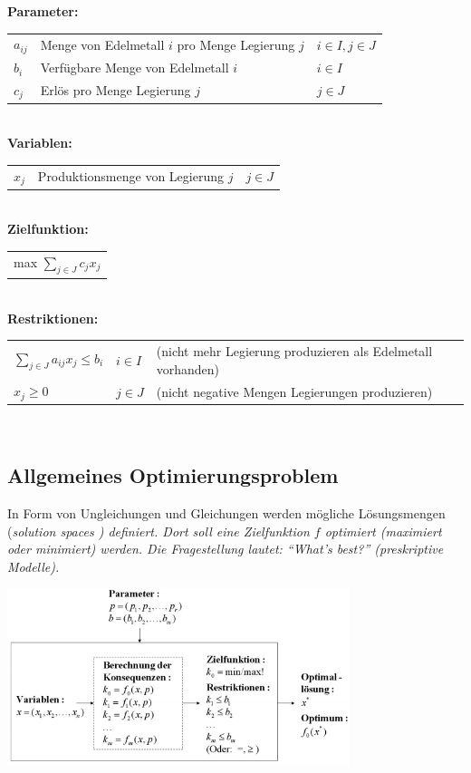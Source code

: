     \textbf{Parameter:}\\
    \begin{tabular}{lll}
      $a_{ij}$ & Menge von Edelmetall $i$ pro Menge Legierung $j$ & $i \in I, j \in J$\\
      $b_i$    & Verfügbare Menge von Edelmetall $i$              & $i \in I$\\
      $c_j$    & Erlös pro Menge Legierung $j$                    & $j \in J$\\
    \end{tabular}\\

    \textbf{Variablen:}\\
    \begin{tabular}{lll}
      $x_j$ & Produktionsmenge von Legierung $j$ & $j \in J$\\
    \end{tabular}\\

    \textbf{Zielfunktion:}\\
    \begin{tabular}{l}
      max $\sum\limits_{j \in J}c_j x_j$\\
    \end{tabular}\\

    \textbf{Restriktionen:}\\
    \begin{tabular}{lll}
      $\sum\limits_{j \in J}a_{ij}x_j \le b_i$ & $i \in I$ & (nicht mehr Legierung produzieren als Edelmetall vorhanden)\\
      $x_j \ge 0$                       & $j \in J$ & (nicht negative Mengen Legierungen produzieren)
    \end{tabular}\\




\subsection{Allgemeines Optimierungsproblem }
  In Form von Ungleichungen und Gleichungen werden mögliche Lösungsmengen (\em solution spaces \em) definiert. Dort soll eine Zielfunktion $f$ optimiert (maximiert oder minimiert) werden. Die Fragestellung lautet: "`What's best?"' (preskriptive Modelle).
  
  \begin{center}
    \includegraphics[width=10cm]{./Content/OptMathModels/OptimiziationModel}
  \end{center}
  
